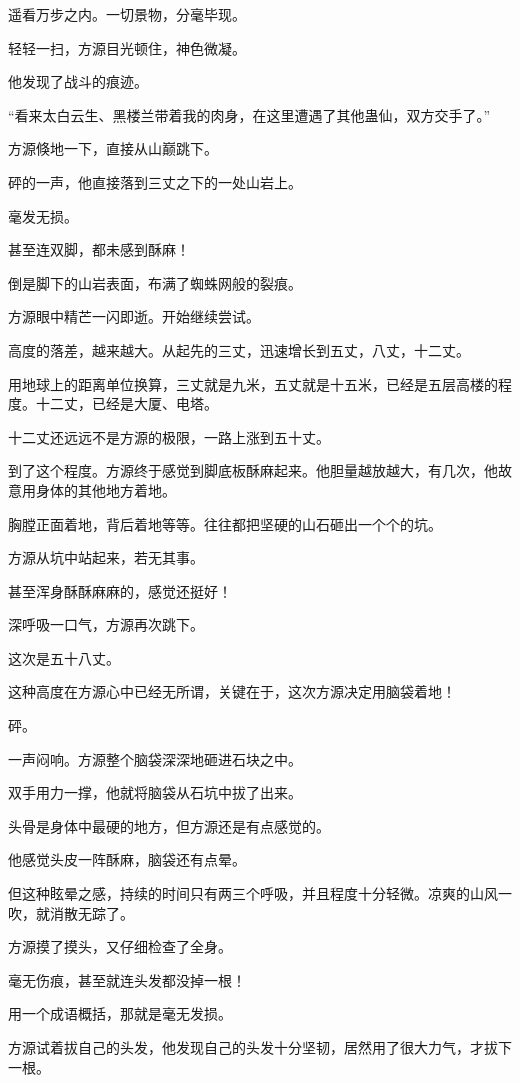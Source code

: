 \begin{this_body}
遥看万步之内。一切景物，分毫毕现。

轻轻一扫，方源目光顿住，神色微凝。

他发现了战斗的痕迹。

“看来太白云生、黑楼兰带着我的肉身，在这里遭遇了其他蛊仙，双方交手了。”

方源倏地一下，直接从山巅跳下。

砰的一声，他直接落到三丈之下的一处山岩上。

毫发无损。

甚至连双脚，都未感到酥麻！

倒是脚下的山岩表面，布满了蜘蛛网般的裂痕。

方源眼中精芒一闪即逝。开始继续尝试。

高度的落差，越来越大。从起先的三丈，迅速增长到五丈，八丈，十二丈。

用地球上的距离单位换算，三丈就是九米，五丈就是十五米，已经是五层高楼的程度。十二丈，已经是大厦、电塔。

十二丈还远远不是方源的极限，一路上涨到五十丈。

到了这个程度。方源终于感觉到脚底板酥麻起来。他胆量越放越大，有几次，他故意用身体的其他地方着地。

胸膛正面着地，背后着地等等。往往都把坚硬的山石砸出一个个的坑。

方源从坑中站起来，若无其事。

甚至浑身酥酥麻麻的，感觉还挺好！

深呼吸一口气，方源再次跳下。

这次是五十八丈。

这种高度在方源心中已经无所谓，关键在于，这次方源决定用脑袋着地！

砰。

一声闷响。方源整个脑袋深深地砸进石块之中。

双手用力一撑，他就将脑袋从石坑中拔了出来。

头骨是身体中最硬的地方，但方源还是有点感觉的。

他感觉头皮一阵酥麻，脑袋还有点晕。

但这种眩晕之感，持续的时间只有两三个呼吸，并且程度十分轻微。凉爽的山风一吹，就消散无踪了。

方源摸了摸头，又仔细检查了全身。

毫无伤痕，甚至就连头发都没掉一根！

用一个成语概括，那就是毫无发损。

方源试着拔自己的头发，他发现自己的头发十分坚韧，居然用了很大力气，才拔下一根。


\end{this_body}
